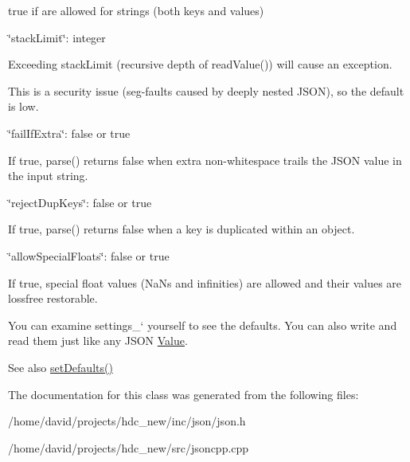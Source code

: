 \begin{DoxyItemize}
\begin{DoxyItemize}
\item true if \textquotesingle{}\textquotesingle{} are allowed for strings (both keys and values)
\end{DoxyItemize}
\item {\ttfamily \char`\"{}stack\+Limit\char`\"{}\+: integer}
\begin{DoxyItemize}
\item Exceeding stack\+Limit (recursive depth of {\ttfamily read\+Value()}) will cause an exception.
\item This is a security issue (seg-\/faults caused by deeply nested J\+S\+ON), so the default is low.
\end{DoxyItemize}
\item {\ttfamily \char`\"{}fail\+If\+Extra\char`\"{}\+: false or true}
\begin{DoxyItemize}
\item If true, {\ttfamily parse()} returns false when extra non-\/whitespace trails the J\+S\+ON value in the input string.
\end{DoxyItemize}
\item {\ttfamily \char`\"{}reject\+Dup\+Keys\char`\"{}\+: false or true}
\begin{DoxyItemize}
\item If true, {\ttfamily parse()} returns false when a key is duplicated within an object.
\end{DoxyItemize}
\item {\ttfamily \char`\"{}allow\+Special\+Floats\char`\"{}\+: false or true}
\begin{DoxyItemize}
\item If true, special float values (Na\+Ns and infinities) are allowed and their values are lossfree restorable.
\end{DoxyItemize}
\end{DoxyItemize}

You can examine \textquotesingle{}settings\+\_\+` yourself to see the defaults. You can also write and read them just like any J\+S\+ON \hyperlink{class_json_1_1_value}{Value}. \begin{DoxySeeAlso}{See also}
\hyperlink{class_json_1_1_char_reader_builder_a03ff031e06aabff989ab4addc87294ab}{set\+Defaults()} 
\end{DoxySeeAlso}


The documentation for this class was generated from the following files\+:\begin{DoxyCompactItemize}
\item 
/home/david/projects/hdc\+\_\+new/inc/json/json.\+h\item 
/home/david/projects/hdc\+\_\+new/src/jsoncpp.\+cpp\end{DoxyCompactItemize}
